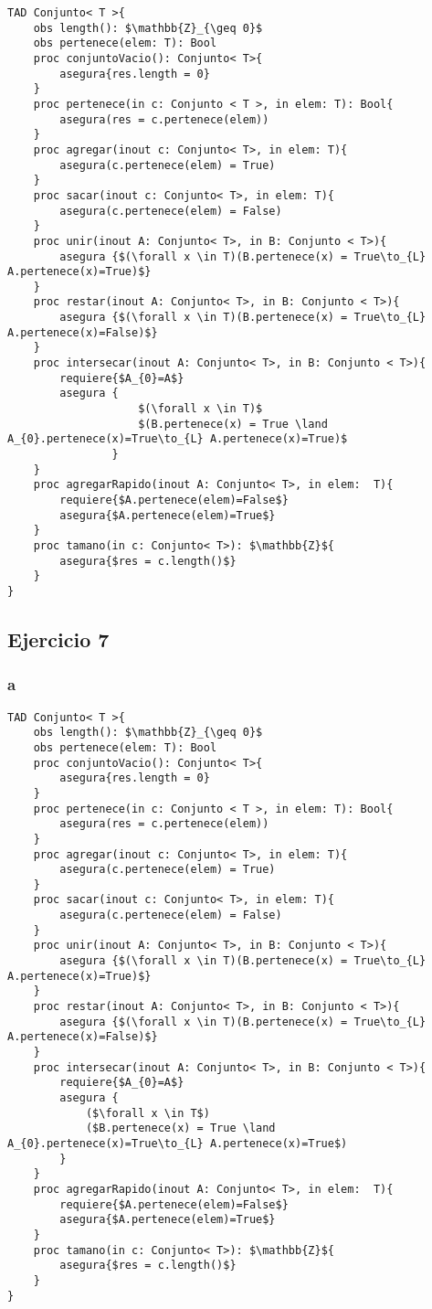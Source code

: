 \documentclass[6pt]{article}
\begin{document}
\begin{lstlisting}
TAD Conjunto< T >{
	obs length(): $\mathbb{Z}_{\geq 0}$
	obs pertenece(elem: T): Bool
	proc conjuntoVacio(): Conjunto< T>{
		asegura{res.length = 0}
	}
	proc pertenece(in c: Conjunto < T >, in elem: T): Bool{
		asegura(res = c.pertenece(elem))
	}
	proc agregar(inout c: Conjunto< T>, in elem: T){
		asegura(c.pertenece(elem) = True)
	}
	proc sacar(inout c: Conjunto< T>, in elem: T){
		asegura(c.pertenece(elem) = False)
	}
	proc unir(inout A: Conjunto< T>, in B: Conjunto < T>){
		asegura {$(\forall x \in T)(B.pertenece(x) = True\to_{L} A.pertenece(x)=True)$}
	}
	proc restar(inout A: Conjunto< T>, in B: Conjunto < T>){
		asegura {$(\forall x \in T)(B.pertenece(x) = True\to_{L} A.pertenece(x)=False)$}
	}
	proc intersecar(inout A: Conjunto< T>, in B: Conjunto < T>){
		requiere{$A_{0}=A$}
		asegura {
                    $(\forall x \in T)$
                    $(B.pertenece(x) = True \land A_{0}.pertenece(x)=True\to_{L} A.pertenece(x)=True)$
                }
	}
	proc agregarRapido(inout A: Conjunto< T>, in elem:  T){
		requiere{$A.pertenece(elem)=False$}
		asegura{$A.pertenece(elem)=True$} 
	}
	proc tamano(in c: Conjunto< T>): $\mathbb{Z}${
		asegura{$res = c.length()$}
	}
}
\end{lstlisting}

\subsection*{Ejercicio 7}
\subsubsection*{a}

\begin{lstlisting}
TAD Conjunto< T >{
	obs length(): $\mathbb{Z}_{\geq 0}$
	obs pertenece(elem: T): Bool
	proc conjuntoVacio(): Conjunto< T>{
		asegura{res.length = 0}
	}
	proc pertenece(in c: Conjunto < T >, in elem: T): Bool{
		asegura(res = c.pertenece(elem))
	}
	proc agregar(inout c: Conjunto< T>, in elem: T){
		asegura(c.pertenece(elem) = True)
	}
	proc sacar(inout c: Conjunto< T>, in elem: T){
		asegura(c.pertenece(elem) = False)
	}
	proc unir(inout A: Conjunto< T>, in B: Conjunto < T>){
		asegura {$(\forall x \in T)(B.pertenece(x) = True\to_{L} A.pertenece(x)=True)$}
	}
	proc restar(inout A: Conjunto< T>, in B: Conjunto < T>){
		asegura {$(\forall x \in T)(B.pertenece(x) = True\to_{L} A.pertenece(x)=False)$}
	}
	proc intersecar(inout A: Conjunto< T>, in B: Conjunto < T>){
		requiere{$A_{0}=A$}
		asegura {
			($\forall x \in T$)
			($B.pertenece(x) = True \land A_{0}.pertenece(x)=True\to_{L} A.pertenece(x)=True$)
		}
	}
	proc agregarRapido(inout A: Conjunto< T>, in elem:  T){
		requiere{$A.pertenece(elem)=False$}
		asegura{$A.pertenece(elem)=True$} 
	}
	proc tamano(in c: Conjunto< T>): $\mathbb{Z}${
		asegura{$res = c.length()$}
	}
}
\end{lstlisting}
\end{document}
